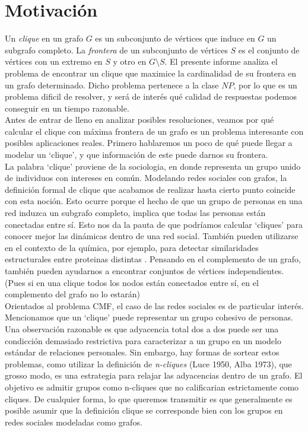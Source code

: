 
\section{Motivación}

Un \textit{clique} en un grafo $G$ es un subconjunto de vértices que induce en $G$ un subgrafo completo. La \textit{frontera} de un subconjunto de vértices $S$ es el conjunto de vértices con un extremo en $S$ y otro en $G \setminus S$. El presente informe analiza el problema de encontrar un clique que maximice la cardinalidad de su frontera en un grafo determinado. Dicho problema pertenece a la clase $NP$, por lo que es un problema dificil de resolver, y será de interés qué calidad de respuestas podemos conseguir en un tiempo razonable. \\

Antes de entrar de lleno en analizar posibles resoluciones, veamos por qué calcular el clique con máxima frontera de un grafo es un problema interesante con posibles aplicaciones reales. Primero hablaremos un poco de qué puede llegar a modelar un `clique', y que información de este puede darnos su frontera. \\

La palabra `clique' proviene de la sociologia, en donde representa un grupo unido de individuos con intereses en común. Modelando redes sociales con grafos, la definición formal de clique que acabamos de realizar hasta cierto punto coincide con esta noción. Esto ocurre porque el hecho de que un grupo de personas en una red induzca un subgrafo completo, implica que todas las personas están conectadas entre sí. Esto nos da la pauta de que podríamos calcular `cliques' para conocer mejor las dinámicas dentro de una red social. También pueden utilizarse en el contexto de la química, por ejemplo, para detectar similaridades estructurales entre proteinas distintas \cite{proteins}. Pensando en el complemento de un grafo, también pueden ayudarnos a encontrar conjuntos de vértices independientes. (Pues si en una clique todos los nodos están conectados entre sí, en el complemento del grafo no lo estarán) \\

Orientados al problema CMF, el caso de las redes sociales es de particular interés. Mencionamos que un `clique' puede representar un grupo cohesivo de personas. Una observación razonable es que adyacencia total dos a dos puede ser una condicción demasiado restrictiva para caracterizar a un grupo en un modelo estándar de relaciones personales. Sin embargo, hay formas de sortear estos problemas, como utilizar la definición de \textit{n-cliques} (Luce 1950, Alba 1973), que grosso modo, es una estrategia para relajar las adyacencias dentro de un grafo. El objetivo es admitir grupos como n-cliques que no calificarian estrictamente como cliques. De cualquier forma, lo que queremos transmitir es que generalmente es posible asumir que la definición clique se corresponde bien con los grupos en redes sociales modeladas como grafos. \\

